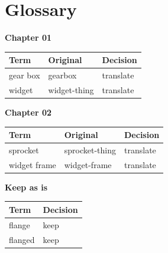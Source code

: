%
%
\chapter{Glossary}
\label{app:glossary}

\textbf{Chapter 01}

\begin{tabular}{@{}llp{4cm}@{}}
\toprule
Term & Original & Decision \\
\midrule
gear box & gearbox & translate \\
widget & widget-thing & translate \\
\bottomrule
\end{tabular}

\bigskip
\textbf{Chapter 02}

\begin{tabular}{@{}llp{4cm}@{}}
\toprule
Term & Original & Decision \\
\midrule
sprocket & sprocket-thing & translate \\
widget frame & widget-frame & translate \\
\bottomrule
\end{tabular}

\bigskip
\textbf{Keep as is}

\begin{tabular}{@{}lp{7cm}@{}}
\toprule
Term & Decision \\
\midrule
flange & keep \\
flanged & keep \\
\bottomrule
\end{tabular}
